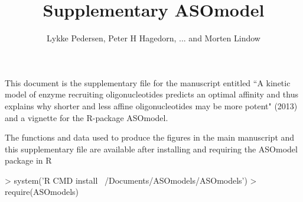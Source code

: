 \documentclass[a4paper,11pt]{article}
\title{Supplementary \textbf{ASOmodel}}
\author{Lykke Pedersen, Peter H Hagedorn, ... and Morten Lindow}
\begin{document}

\maketitle

This document is the supplementary file for the manuscript entitled ``A kinetic model of enzyme recruiting oligonucleotides predicts an optimal affinity and thus explains why shorter and less affine oligonucleotides may be more potent" (2013) and a vignette for the R-package ASOmodel.


The functions and data used to produce the figures in the main manuscript and this supplementary file are available after installing and requiring the ASOmodel package in R
\begin{Schunk}
\begin{Sinput}
> system('R CMD install ~/Documents/ASOmodels/ASOmodels')
> require(ASOmodels)
\end{Sinput}
\end{Schunk}
\end{document}
